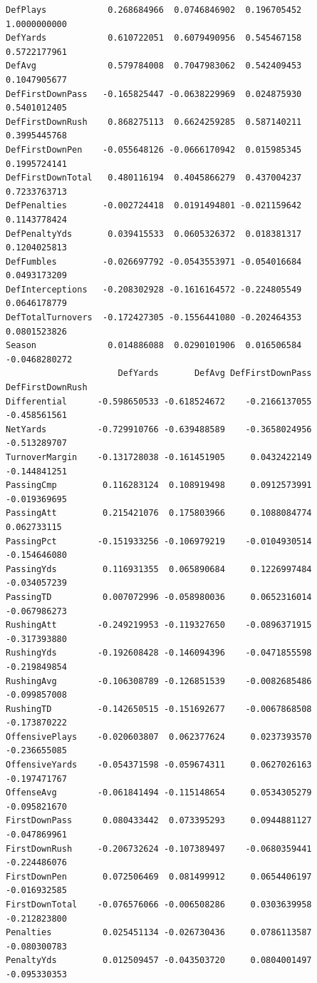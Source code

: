 \documentclass[
  letterpaper,
  DIV=11,
  numbers=noendperiod]{scrreprt}
\begin{document}
\begin{verbatim}
DefPlays            0.268684966  0.0746846902  0.196705452  1.0000000000
DefYards            0.610722051  0.6079490956  0.545467158  0.5722177961
DefAvg              0.579784008  0.7047983062  0.542409453  0.1047905677
DefFirstDownPass   -0.165825447 -0.0638229969  0.024875930  0.5401012405
DefFirstDownRush    0.868275113  0.6624259285  0.587140211  0.3995445768
DefFirstDownPen    -0.055648126 -0.0666170942  0.015985345  0.1995724141
DefFirstDownTotal   0.480116194  0.4045866279  0.437004237  0.7233763713
DefPenalties       -0.002724418  0.0191494801 -0.021159642  0.1143778424
DefPenaltyYds       0.039415533  0.0605326372  0.018381317  0.1204025813
DefFumbles         -0.026697792 -0.0543553971 -0.054016684  0.0493173209
DefInterceptions   -0.208302928 -0.1616164572 -0.224805549  0.0646178779
DefTotalTurnovers  -0.172427305 -0.1556441080 -0.202464353  0.0801523826
Season              0.014886088  0.0290101906  0.016506584 -0.0468280272
                      DefYards       DefAvg DefFirstDownPass DefFirstDownRush
Differential      -0.598650533 -0.618524672    -0.2166137055     -0.458561561
NetYards          -0.729910766 -0.639488589    -0.3658024956     -0.513289707
TurnoverMargin    -0.131728038 -0.161451905     0.0432422149     -0.144841251
PassingCmp         0.116283124  0.108919498     0.0912573991     -0.019369695
PassingAtt         0.215421076  0.175803966     0.1088084774      0.062733115
PassingPct        -0.151933256 -0.106979219    -0.0104930514     -0.154646080
PassingYds         0.116931355  0.065890684     0.1226997484     -0.034057239
PassingTD          0.007072996 -0.058980036     0.0652316014     -0.067986273
RushingAtt        -0.249219953 -0.119327650    -0.0896371915     -0.317393880
RushingYds        -0.192608428 -0.146094396    -0.0471855598     -0.219849854
RushingAvg        -0.106308789 -0.126851539    -0.0082685486     -0.099857008
RushingTD         -0.142650515 -0.151692677    -0.0067868508     -0.173870222
OffensivePlays    -0.020603807  0.062377624     0.0237393570     -0.236655085
OffensiveYards    -0.054371598 -0.059674311     0.0627026163     -0.197471767
OffenseAvg        -0.061841494 -0.115148654     0.0534305279     -0.095821670
FirstDownPass      0.080433442  0.073395293     0.0944881127     -0.047869961
FirstDownRush     -0.206732624 -0.107389497    -0.0680359441     -0.224486076
FirstDownPen       0.072506469  0.081499912     0.0654406197     -0.016932585
FirstDownTotal    -0.076576066 -0.006508286     0.0303639958     -0.212823800
Penalties          0.025451134 -0.026730436     0.0786113587     -0.080300783
PenaltyYds         0.012509457 -0.043503720     0.0804001497     -0.095330353

\end{verbatim}
\end{document}
